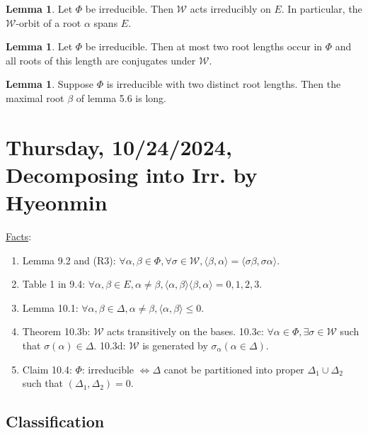 \documentclass{article}
\theoremstyle{definition}
\newtheorem{lemma}[theorem]{Lemma}
\begin{document}
\begin{lemma}
    Let \(\Phi\) be irreducible. Then \(\mathcal{W}\) acts irreducibly on \(E\). In particular, the \(\mathcal{W}\)-orbit of a root \(\alpha\) spans \(E\).
\end{lemma}

\begin{lemma}
    Let \(\Phi\) be irreducible. Then at most two root lengths occur in \(\Phi\) and all roots of this length are conjugates under \(\mathcal{W}\).
\end{lemma}

\begin{lemma}
    Suppose \(\Phi\) is irreducible with two distinct root lengths. Then the maximal root \(\beta\) of lemma 5.6 is long.
\end{lemma}

\section{Thursday, 10/24/2024, Decomposing into Irr. by Hyeonmin}

\underline{Facts}:

\begin{enumerate}[label=\arabic*)]
    \item Lemma 9.2 and (R3): \(\forall \alpha , \beta \in \Phi , \forall \sigma \in \mathcal{W}, \langle \beta , \alpha \rangle = \langle \sigma \beta, \sigma \alpha \rangle\).
    \item Table 1 in 9.4: \(\forall \alpha ,\beta \in E, \alpha \neq \beta, \langle \alpha , \beta \rangle \langle \beta , \alpha \rangle = 0, 1, 2, 3\).
    \item Lemma 10.1: \(\forall \alpha , \beta \in \Delta, \alpha \neq \beta, \langle \alpha , \beta \rangle \leq 0\).
    \item Theorem 10.3b: \(\mathcal{W}\) acts transitively on the bases. 10.3c: \(\forall \alpha \in \Phi , \exists \sigma \in \mathcal{W}\) such that \(\sigma(\alpha)\in \Delta\). 10.3d: \(\mathcal{W}\) is generated by \(\sigma_\alpha (\alpha \in \Delta)\).
    \item Claim 10.4: \(\Phi\): irreducible \(\iff \Delta\) canot be partitioned into proper \(\Delta _1 \cup \Delta_2\) such that \((\Delta_1, \Delta_2)=0\).
\end{enumerate} 

\subsection*{Classification}
\end{document}
